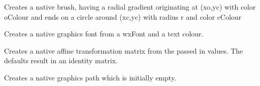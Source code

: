 Creates a native brush, having a radial gradient originating at (xo,yc) with color oColour and ends on a circle around (xc,yc) with radius r and color cColour

\label{wxgraphicsrenderercreatefont}


Creates a native graphics font from a wxFont and a text colour.

\label{wxgraphicsrenderercreatematrix}


Creates a native affine transformation matrix from the passed in values. The defaults result in an identity matrix.

\label{wxgraphicsrenderercreatepath}


Creates a native graphics path which is initially empty.


